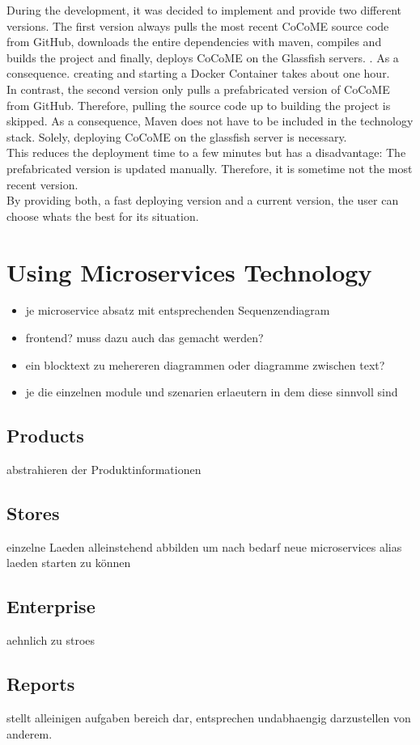 	
	During the development, it was decided to implement and provide two different versions. The first version always pulls the most recent CoCoME source code from GitHub, downloads the entire dependencies with maven, compiles and builds the project and finally, deploys CoCoME on the Glassfish servers. . As a consequence. creating and starting a Docker Container takes about one hour.\\
	In contrast, the second version only  pulls a prefabricated version of CoCoME from GitHub. Therefore, pulling the source code up to building the project is skipped. As a consequence, Maven does not have to be included in the technology stack. Solely, deploying CoCoME on the glassfish server is necessary.\\
	This reduces the deployment time to a few minutes but has a disadvantage: The prefabricated version is updated manually. Therefore, it is sometime not the most recent version.\\
	By providing both, a fast deploying version and a current version, the user can choose whats the best for its situation.
	

	

	
\section{Using Microservices Technology} \label{MS}
	\begin{itemize}
		\item je microservice absatz mit entsprechenden Sequenzendiagram %
		\item frontend? muss dazu auch das gemacht werden?
		\item ein blocktext zu mehereren diagrammen oder diagramme zwischen text?
		
	
			\item je die einzelnen module und szenarien erlaeutern in dem diese sinnvoll sind
	\end{itemize}
	
		\subsection{Products}
		abstrahieren der Produktinformationen 
		
		\subsection{Stores}
		einzelne Laeden alleinstehend abbilden um nach bedarf neue microservices alias laeden starten zu können
		
		\subsection{Enterprise}
		aehnlich zu stroes
		
		\subsection{Reports}
		stellt alleinigen aufgaben bereich dar, entsprechen undabhaengig darzustellen von anderem.

